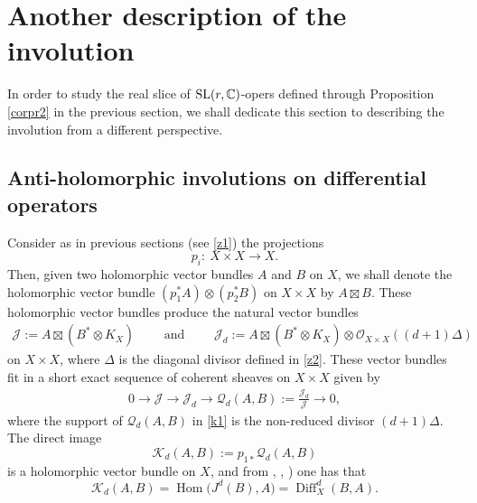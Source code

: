 \documentclass[pdftex]{sigma}
\numberwithin{equation}{section}
\begin{document}
\section{Another description of the involution}

In order to study the real slice of ${\rm SL}(r,\mathbb{C})$-opers defined through Proposition \ref{corpr2} in the previous section, we shall dedicate this section to describing the involution from a different perspective.

\subsection{Anti-holomorphic involutions on differential operators} Consider as in previous sections (see \eqref{z1}) the projections
\[
p_i\colon\ X\times X \longrightarrow X.
\]
Then, given two holomorphic vector bundles $A$ and $B$ on $X$, we shall denote the holomorphic vector bundle $(p^*_1 A)\otimes (p^*_2 B)$ on
$X\times X$ by $A\boxtimes B$.
These holomorphic vector bundles produce the natural vector bundles
\begin{eqnarray}\label{abr}
\mathcal{J} := A\boxtimes (B^*\otimes K_X)\qquad \text{ and }\qquad
\mathcal{J}_d := A\boxtimes (B^*\otimes K_X)\otimes {\mathcal O}_{X\times X}((d+1){\Delta})\end{eqnarray} on $X\times X$,
where $\Delta$ is the diagonal divisor defined in \eqref{z2}. These vector bundles fit in a short exact sequence of coherent
sheaves on $X\times X$ given by
\begin{gather}
0 \longrightarrow \mathcal{J} \longrightarrow \mathcal{J}_d \longrightarrow {\mathcal Q}_d(A, B)
 := \frac{\mathcal{J}_d}{\mathcal{J}} \longrightarrow 0,
\label{k1}
\end{gather}
where the support of ${\mathcal Q}_d(A, B)$ in \eqref{k1}
is the non-reduced divisor $(d+1){\Delta}$. The direct image
\begin{equation}\label{k2}
{\mathcal K}_d(A, B) := p_{1*} {\mathcal Q}_d(A, B)
\end{equation}
is a holomorphic vector bundle on $X$, and from \cite[Section 2.1]{BS}, \cite[p.~25, equation~(5.1)]{Bi},
\cite[Section 3.1, p.~1314]{BB}) one has that
\begin{equation}\label{k3}
{\mathcal K}_d(A, B) = \operatorname{Hom}\bigl(J^d(B), A\bigr) = \operatorname{Diff}^d_X(B, A).
\end{equation}
\end{document}

